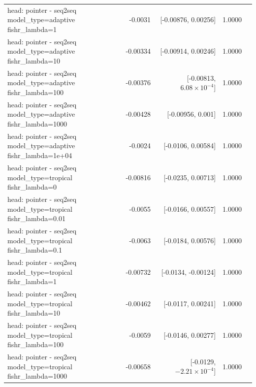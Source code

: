 \documentclass[10pt]{article}
\makeatletter
\newcommand{\stackcell}[1]{\begin{tabular}[t]{@{}l@{}}#1\end{tabular}}
\makeatother
\begin{document}
{\begin{longtable}{lrrrl}
\stackcell{head: pointer - seq2seq\\\footnotesize model\_type=adaptive fishr\_lambda=1 } & -0.0031 & [-0.00876, 0.00256] & 1.0000 & \\
\stackcell{head: pointer - seq2seq\\\footnotesize model\_type=adaptive fishr\_lambda=10 } & -0.00334 & [-0.00914, 0.00246] & 1.0000 & \\
\stackcell{head: pointer - seq2seq\\\footnotesize model\_type=adaptive fishr\_lambda=100 } & -0.00376 & [-0.00813, $6.08\times10^{-4}$] & 1.0000 & \\
\stackcell{head: pointer - seq2seq\\\footnotesize model\_type=adaptive fishr\_lambda=1000 } & -0.00428 & [-0.00956, 0.001] & 1.0000 & \\
\stackcell{head: pointer - seq2seq\\\footnotesize model\_type=adaptive fishr\_lambda=1e+04 } & -0.0024 & [-0.0106, 0.00584] & 1.0000 & \\
\stackcell{head: pointer - seq2seq\\\footnotesize model\_type=tropical fishr\_lambda=0 } & -0.00816 & [-0.0235, 0.00713] & 1.0000 & \\
\stackcell{head: pointer - seq2seq\\\footnotesize model\_type=tropical fishr\_lambda=0.01 } & -0.0055 & [-0.0166, 0.00557] & 1.0000 & \\
\stackcell{head: pointer - seq2seq\\\footnotesize model\_type=tropical fishr\_lambda=0.1 } & -0.0063 & [-0.0184, 0.00576] & 1.0000 & \\
\stackcell{head: pointer - seq2seq\\\footnotesize model\_type=tropical fishr\_lambda=1 } & -0.00732 & [-0.0134, -0.00124] & 1.0000 & \\
\stackcell{head: pointer - seq2seq\\\footnotesize model\_type=tropical fishr\_lambda=10 } & -0.00462 & [-0.0117, 0.00241] & 1.0000 & \\
\stackcell{head: pointer - seq2seq\\\footnotesize model\_type=tropical fishr\_lambda=100 } & -0.0059 & [-0.0146, 0.00277] & 1.0000 & \\
\stackcell{head: pointer - seq2seq\\\footnotesize model\_type=tropical fishr\_lambda=1000 } & -0.00658 & [-0.0129, $-2.21\times10^{-4}$] & 1.0000 & \\

\end{longtable}}
\end{document}
